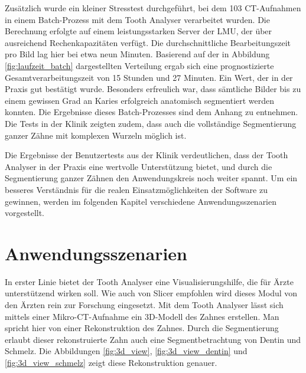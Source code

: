 Zusätzlich wurde ein kleiner Stresstest durchgeführt, bei dem 103 \ac{CT}-Aufnahmen
in einem Batch-Prozess mit dem Tooth Analyser verarbeitet wurden. Die Berechnung
erfolgte auf einem leistungsstarken Server der LMU, der über ausreichend
Rechenkapazitäten verfügt. Die durchschnittliche Bearbeitungszeit pro Bild lag hier
bei etwa neun Minuten. Basierend auf der in Abbildung \ref{fig:laufzeit_batch}
dargestellten Verteilung ergab sich eine prognostizierte Gesamtverarbeitungszeit
von 15 Stunden und 27 Minuten. Ein Wert, der in der Praxis gut bestätigt wurde. Besonders
erfreulich war, dass sämtliche Bilder bis zu einem gewissen Grad an Karies
erfolgreich anatomisch segmentiert werden konnten. Die Ergebnisse dieses Batch-Prozesses
sind dem Anhang zu entnehmen. Die Tests in der Klinik zeigten zudem, dass auch die
vollständige Segmentierung ganzer Zähne mit komplexen Wurzeln möglich ist.

Die Ergebnisse der Benutzertests aus der Klinik verdeutlichen, dass der Tooth
Analyser in der Praxis eine wertvolle Unterstützung bietet, und durch die Segmentierung
ganzer Zähnen den Anwendungskreis noch weiter spannt. Um ein besseres
Verständnis für die realen Einsatzmöglichkeiten der Software zu gewinnen, werden
im folgenden Kapitel verschiedene Anwendungsszenarien vorgestellt.

\section{Anwendungsszenarien}
In erster Linie bietet der Tooth Analyser eine Visualisierungshilfe, die für
Ärzte unterstützend wirken soll. Wie auch von Slicer empfohlen wird dieses Modul
von den Ärzten rein zur Forschung eingesetzt. Mit dem Tooth Analyser lässt sich
mittels einer Mikro-\ac{CT}-Aufnahme ein \ac{3D}-Modell des Zahnes erstellen. Man
spricht hier von einer Rekonstruktion des Zahnes. Durch die Segmentierung
erlaubt dieser rekonstruierte Zahn auch eine Segmentbetrachtung von Dentin und
Schmelz. Die Abbildungen \ref{fig:3d_view}, \ref{fig:3d_view_dentin} und
\ref{fig:3d_view_schmelz} zeigt diese Rekonstruktion genauer.

